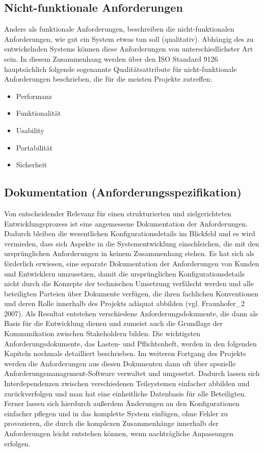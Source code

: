 \cite{partsch-re}

\subsection{Nicht-funktionale Anforderungen}
Anders als funktionale Anforderungen, beschreiben die nicht-funktionalen Anforderungen, wie gut ein System etwas tun soll (qualitativ). Abhängig des zu entwickelnden Systems können diese Anforderungen von unterschiedlichster Art sein. In diesem Zusammenhang werden über den ISO Standard 9126 hauptsächlich folgende sogenannte Qualitätsattribute für nicht-funktionale Anforderungen beschrieben, die für die meisten Projekte zutreffen:

\begin{itemize}
	\item Performanz
	\item Funktionalität
	\item Usability
	\item Portabilität
	\item Sicherheit
\end{itemize}

\cite{fraunhofer}

\subsection{Dokumentation (Anforderungsspezifikation)}
Von entscheidender Relevanz für einen strukturierten und zielgerichteten Entwicklungsprozess ist eine angemessene Dokumentation der Anforderungen. Dadurch bleiben die wesentlichen Konfigurationsdetails im Blickfeld und es wird vermieden, dass sich Aspekte in die Systementwicklung einschleichen, die mit den ursprünglichen Anforderungen in keinem Zusammenhang stehen. 
Es hat sich als förderlich erwiesen, eine separate Dokumentation der Anforderungen von Kunden und Entwicklern umzusetzen, damit die ursprünglichen Konfigurationsdetails nicht durch die Konzepte der technischen Umsetzung verfälscht werden und alle beteiligten Parteien über Dokumente verfügen, 
die ihren fachlichen Konventionen und deren Rolle innerhalb des Projekts adäquat abbilden (vgl. Fraunhofer\_2 2007). Als Resultat entstehen 
verschiedene Anforderungsdokumente, die dann als Basis für die Entwicklung dienen und zumeist auch die Grundlage der Kommunikation zwischen Stakeholdern bilden. Die wichtigsten Anforderungsdokumente, das Lasten- und 
Pflichtenheft, werden in den folgenden Kapiteln nochmals detailliert beschrieben. 
Im weiteren Fortgang des Projekts werden die Anforderungen aus diesen Dokumenten dann oft über spezielle Anforderungsmanagement-Software verwaltet und umgesetzt. Dadurch lassen sich Interdependenzen zwischen verschiedenen Teilsystemen einfacher abbilden und zurückverfolgen und man hat eine einheitliche Datenbasis für alle Beteiligten. Ferner lassen sich hierdurch außerdem Änderungen an den Konfigurationen einfacher pflegen und in das komplette System einfügen, ohne Fehler zu provozieren, die durch die komplexen Zusammenhänge innerhalb der Anforderungen leicht entstehen können, wenn nachträgliche Anpassungen erfolgen.
\cite{fraunhofer-anforderung}

